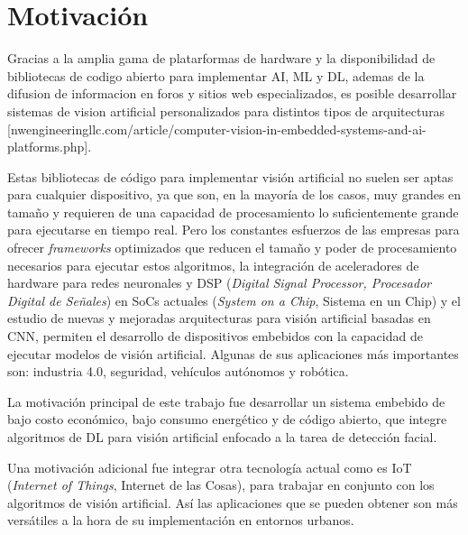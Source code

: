 \section{Motivación}
Gracias a la amplia gama de platarformas de hardware y la disponibilidad de bibliotecas de codigo abierto para implementar AI, ML y DL, ademas de la difusion de informacion en foros y sitios web especializados, es posible desarrollar sistemas de vision artificial personalizados para distintos tipos de arquitecturas [nwengineeringllc.com/article/computer-vision-in-embedded-systems-and-ai-platforms.php].

Estas bibliotecas de código para implementar visión artificial no suelen ser aptas para cualquier dispositivo, ya que son, en la mayoría de los casos, muy grandes en tamaño y requieren de una capacidad de procesamiento lo suficientemente grande para ejecutarse en tiempo real. Pero los constantes esfuerzos de las empresas para ofrecer \textit{frameworks} optimizados que reducen el tamaño y poder de procesamiento necesarios para ejecutar estos algoritmos, la integración de aceleradores de hardware para redes neuronales y DSP (\textit{Digital Signal Processor, Procesador Digital de Señales}) en SoCs actuales (\textit{System on a Chip}, Sistema en un Chip) y el estudio de nuevas y mejoradas arquitecturas para visión artificial basadas en CNN, permiten el desarrollo de dispositivos embebidos con la capacidad de ejecutar modelos de visión artificial. Algunas de sus aplicaciones más importantes son: industria 4.0, seguridad, vehículos autónomos y robótica.

La motivación principal de este trabajo fue desarrollar un sistema embebido de bajo costo económico, bajo consumo energético y de código abierto, que integre algoritmos de DL para visión artificial enfocado a la tarea de detección facial.

Una motivación adicional fue integrar otra tecnología actual como es IoT (\textit{Internet of Things}, Internet de las Cosas), para trabajar en conjunto con los algoritmos de visión artificial. Así las aplicaciones que se pueden obtener son más versátiles a la hora de su implementación en entornos urbanos.

